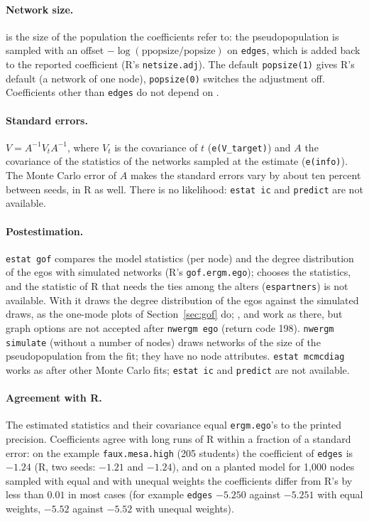 \paragraph{Network size.}  is the size of the population the coefficients refer to: the pseudopopulation is sampled with an offset $-\log(\mathrm{ppopsize}/\mathrm{popsize})$ on \texttt{edges}, which is added back to the reported coefficient (R's \texttt{netsize.adj}). The default \texttt{popsize(1)} gives R's default (a network of one node), \texttt{popsize(0)} switches the adjustment off. Coefficients other than \texttt{edges} do not depend on .

\paragraph{Standard errors.} $V=A^{-1}V_tA^{-1}$, where $V_t$ is the covariance of $t$ (\texttt{e(V\_target)}) and $A$ the covariance of the statistics of the networks sampled at the estimate (\texttt{e(info)}). The Monte Carlo error of $A$ makes the standard errors vary by about ten percent between seeds, in R as well. There is no likelihood: \texttt{estat ic} and \texttt{predict} are not available.

\paragraph{Postestimation.} \texttt{estat gof} compares the model statistics (per node) and the degree distribution of the egos with simulated networks (R's \texttt{gof.ergm.ego});  chooses the statistics, and the statistic of R that needs the ties among the alters (\texttt{espartners}) is not available. With  it draws the degree distribution of the egos against the simulated draws, as the one-mode plots of Section~\ref{sec:gof} do; ,  and  work as there, but graph options are not accepted after \texttt{nwergm ego} (return code 198). \texttt{nwergm simulate} (without a number of nodes) draws networks of the size of the pseudopopulation from the fit; they have no node attributes. \texttt{estat mcmcdiag} works as after other Monte Carlo fits; \texttt{estat ic} and \texttt{predict} are not available.

\paragraph{Agreement with R.} The estimated statistics and their covariance equal \texttt{ergm.ego}'s to the printed precision. Coefficients agree with long runs of R within a fraction of a standard error: on the example \texttt{faux.mesa.high} (205 students) the coefficient of \texttt{edges} is $-1.24$ (R, two seeds: $-1.21$ and $-1.24$), and on a planted model for 1,000 nodes sampled with equal and with unequal weights the coefficients differ from R's by less than $0.01$ in most cases (for example \texttt{edges} $-5.250$ against $-5.251$ with equal weights, $-5.52$ against $-5.52$ with unequal weights).


